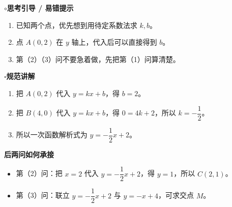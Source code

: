 \documentclass{exam-zh}
\newcommand{\eduSubTitle}[1]{%
  \vspace{1mm}
  {\color{edu-blue}\bfseries #1}\par
  \vspace{1mm}
}
\newcommand{\eduColumnTitle}[2]{%
  {\color{edu-blue}\bfseries #1\hspace{1.5mm}#2}\par
  \vspace{2.5mm}
}
\newcommand{\eduIconBulb}{\(\circ\)}
\newcommand{\eduIconBook}{\(\square\)}
\newenvironment{eduDualExplain}{%
  \needspace{10\baselineskip}
  \par\noindent
}{%
  \par\vspace{5mm}
}
\newenvironment{eduExplainLeft}{%
  \begin{minipage}[t]{0.33\linewidth}
  \small
  \color{edu-ink}
}{%
  \end{minipage}
}
\newcommand{\eduColumnDivider}{%
  \hspace{4mm}{\color{edu-blue}\vrule width 0.45pt}\hspace{4mm}%
}
\newenvironment{eduExplainRight}{%
  \begin{minipage}[t]{0.58\linewidth}
  \small
  \color{edu-ink}
}{%
  \end{minipage}
}
\newenvironment{eduNumberList}{%
  \begin{enumerate}[
    label=\arabic*.,
    leftmargin=6mm,
    itemsep=2.1mm,
    topsep=0pt,
    parsep=0pt
  ]
}{%
  \end{enumerate}
}
\newenvironment{eduBulletList}{%
  \begin{itemize}[
    label=\textbullet,
    leftmargin=5mm,
    itemsep=1.2mm,
    topsep=0pt,
    parsep=0pt
  ]
}{%
  \end{itemize}
}
\begin{document}
\begin{eduDualExplain}
  \begin{eduExplainLeft}
    \eduColumnTitle{\eduIconBulb}{思考引导 / 易错提示}
    \begin{eduNumberList}
      \item 已知两个点，优先想到用待定系数法求 $k,b$。      \item 点 $A(0,2)$ 在 $y$ 轴上，代入后可以直接得到 $b$。      \item 第（2）（3）问不要急着做，先把第（1）问算清楚。    \end{eduNumberList}
  \end{eduExplainLeft}
  \eduColumnDivider
  \begin{eduExplainRight}
    \eduColumnTitle{\eduIconBook}{规范讲解}
    \begin{eduNumberList}
      \item 把 $A(0,2)$ 代入 $y = kx + b$，得 $b = 2$。      \item 把 $B(4,0)$ 代入 $y = kx + b$，得 $0 = 4k + 2$，所以 $k = -\dfrac{1}{2}$。      \item 所以一次函数解析式为 $y = -\dfrac{1}{2}x + 2$。    \end{eduNumberList}

    \vspace{1mm}
    \eduSubTitle{后两问如何承接}
    \begin{eduBulletList}
      \item 第（2）问：把 $x = 2$ 代入 $y = -\dfrac{1}{2}x + 2$，得 $y = 1$，所以 $C(2,1)$。      \item 第（3）问：联立 $y = -\dfrac{1}{2}x + 2$ 与 $y = -x + 4$，可求交点 $M$。    \end{eduBulletList}
  \end{eduExplainRight}
\end{eduDualExplain}
\end{document}
